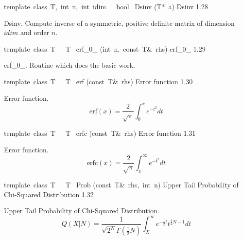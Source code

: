 \documentclass{article}
\begin{document}
\begin{cxxentry}
\begin{cxxfunction}
\begin{cxxdoc}
\end{cxxdoc}
\end{cxxfunction}
\begin{cxxfunction}
{template\ \<class\ T,\ int\ n,\ int\ idim\>\ \ \ bool\ }
        {Dsinv}
        {(T*\ a)}
        {Dsinv}
        {1.28}
\begin{cxxdoc}
Dsinv.
Compute inverse of a symmetric, positive definite matrix of dimension
$idim$ and order $n$.


\end{cxxdoc}
\end{cxxfunction}
\begin{cxxfunction}
{template\ \<class\ T\>\ \ \ T\ }
        {erf\_0\_}
        {(int\ n,\ const\ T\&\ rhs)}
        {erf\_0\_}
        {1.29}
\begin{cxxdoc}
erf\_0\_.
Routine which does the basic work.


\end{cxxdoc}
\end{cxxfunction}
\begin{cxxfunction}
{template\ \<class\ T\>\ \ \ T\ }
        {erf}
        {(const\ T\&\ rhs)}
        {Error function}
        {1.30}
\begin{cxxdoc}
Error function.
\begin{displaymath}
\textrm{erf}(x) = \frac{2}{\sqrt{\pi}} \int^x_0 e^{-t^2} dt
\end{displaymath}


\end{cxxdoc}
\end{cxxfunction}
\begin{cxxfunction}
{template\ \<class\ T\>\ \ \ T\ }
        {erfc}
        {(const\ T\&\ rhs)}
        {Error function}
        {1.31}
\begin{cxxdoc}
Error function.
\begin{displaymath}
\textrm{erfc}(x) = \frac{2}{\sqrt{\pi}} \int^\infty_x e^{-t^2} dt
\end{displaymath}


\end{cxxdoc}
\end{cxxfunction}
\begin{cxxfunction}
{template\ \<class\ T\>\ \ \ T\ }
        {Prob}
        {(const\ T\&\ rhs,\ int\ n)}
        {Upper Tail Probability of Chi-Squared Distribution}
        {1.32}
\begin{cxxdoc}
Upper Tail Probability of Chi-Squared Distribution.
\begin{displaymath}
Q(X|N) = \frac{1}{\sqrt{2^N}\Gamma(\frac{1}{2}N)} \int^\infty_X
e^{-\frac{1}{2}t} t^{\frac{1}{2}N-1} dt
\end{displaymath}



\end{cxxdoc}
\end{cxxfunction}
\end{cxxentry}
\end{document}
